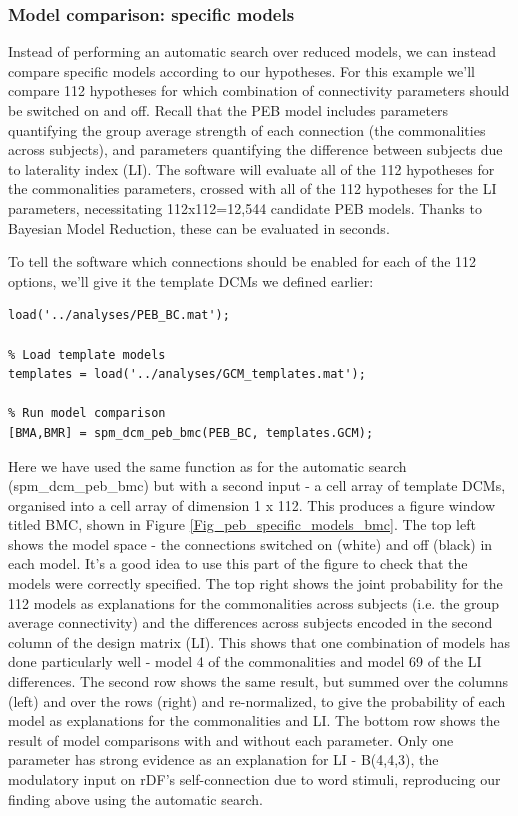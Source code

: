 \documentclass{article}
\begin{document}
\subsubsection{Model comparison: specific models}
Instead of performing an automatic search over reduced models, we can instead compare specific models according to our hypotheses. For this example we'll compare 112 hypotheses for which combination of connectivity parameters should be switched on and off. Recall that the PEB model includes parameters quantifying the group average strength of each connection (the commonalities across subjects), and parameters quantifying the difference between subjects due to laterality index (LI). The software will evaluate all of the 112 hypotheses for the commonalities parameters, crossed with all of the 112 hypotheses for the LI parameters, necessitating 112x112=12,544 candidate PEB models. Thanks to Bayesian Model Reduction, these can be evaluated in seconds.

To tell the software which connections should be enabled for each of the 112 options, we'll give it the template DCMs we defined earlier:

\begin{lstlisting}[style=Matlab-editor,caption=Compare specific PEB models]
% Load estimated PEB
load('../analyses/PEB_BC.mat');

% Load template models
templates = load('../analyses/GCM_templates.mat');

% Run model comparison
[BMA,BMR] = spm_dcm_peb_bmc(PEB_BC, templates.GCM);
\end{lstlisting}

Here we have used the same function as for the automatic search (spm\_dcm\_peb\_bmc) but with a second input - a cell array of template DCMs, organised into a cell array of dimension 1 x 112. This produces a figure window titled BMC, shown in Figure \ref{Fig_peb_specific_models_bmc}. The top left shows the model space - the connections switched on (white) and off (black) in each model. It's a good idea to use this part of the figure to check that the models were correctly specified. The top right shows the joint probability for the 112 models as explanations for the commonalities across subjects (i.e. the group average connectivity) and the differences across subjects encoded in the second column of the design matrix (LI). This shows that one combination of models has done particularly well - model 4 of the commonalities and model 69 of the LI differences. The second row shows the same result, but summed over the columns (left) and over the rows (right) and re-normalized, to give the probability of each model as explanations for the commonalities and LI. The bottom row shows the result of model comparisons with and without each parameter. Only one parameter has strong evidence as an explanation for LI - B(4,4,3), the modulatory input on rDF's self-connection due to word stimuli, reproducing our finding above using the automatic search.
\end{document}
